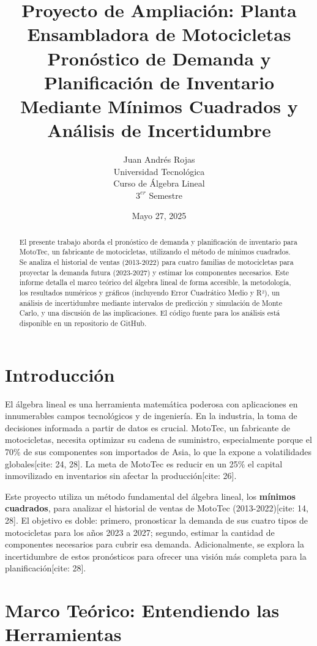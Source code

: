 \documentclass[12pt,a4paper]{article}
\title{
    Proyecto de Ampliación: Planta Ensambladora de Motocicletas \\
    \large Pronóstico de Demanda y Planificación de Inventario Mediante Mínimos Cuadrados y Análisis de Incertidumbre
}
\author{
    Juan Andrés Rojas \\
    Universidad Tecnológica \\
    Curso de Álgebra Lineal \\
    $3^{er}$ Semestre
}
\date{Mayo 27, 2025}
\begin{document}
\maketitle
\thispagestyle{empty}

\begin{abstract}
El presente trabajo aborda el pronóstico de demanda y planificación de inventario para MotoTec, un fabricante de motocicletas, utilizando el método de mínimos cuadrados. Se analiza el historial de ventas (2013-2022) para cuatro familias de motocicletas para proyectar la demanda futura (2023-2027) y estimar los componentes necesarios. Este informe detalla el marco teórico del álgebra lineal de forma accesible, la metodología, los resultados numéricos y gráficos (incluyendo Error Cuadrático Medio y R²), un análisis de incertidumbre mediante intervalos de predicción y simulación de Monte Carlo, y una discusión de las implicaciones. El código fuente para los análisis está disponible en un repositorio de GitHub.
\end{abstract}
\vspace{0.2cm}

\section{Introducción}
El álgebra lineal es una herramienta matemática poderosa con aplicaciones en innumerables campos tecnológicos y de ingeniería. En la industria, la toma de decisiones informada a partir de datos es crucial. MotoTec, un fabricante de motocicletas, necesita optimizar su cadena de suministro, especialmente porque el 70\% de sus componentes son importados de Asia, lo que la expone a volatilidades globales[cite: 24, 28]. La meta de MotoTec es reducir en un 25\% el capital inmovilizado en inventarios sin afectar la producción[cite: 26].

Este proyecto utiliza un método fundamental del álgebra lineal, los \textbf{mínimos cuadrados}, para analizar el historial de ventas de MotoTec (2013-2022)[cite: 14, 28]. El objetivo es doble: primero, pronosticar la demanda de sus cuatro tipos de motocicletas para los años 2023 a 2027; segundo, estimar la cantidad de componentes necesarios para cubrir esa demanda. Adicionalmente, se explora la incertidumbre de estos pronósticos para ofrecer una visión más completa para la planificación[cite: 28].

\section{Marco Teórico: Entendiendo las Herramientas}
\end{document}
